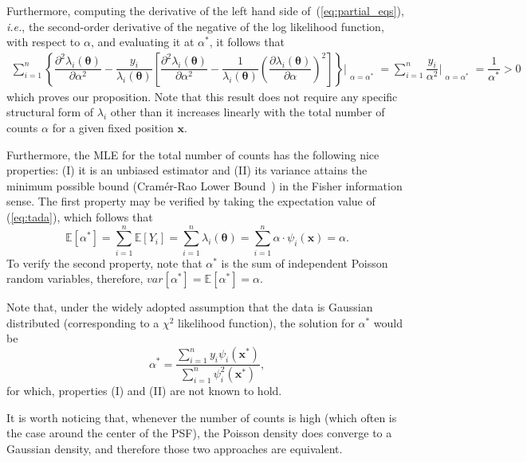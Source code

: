 \documentclass{rnaastex}
\begin{document}
Furthermore, computing the derivative of the left hand side
of~(\ref{eq:partial_eqs}), \textit{i.e.}, the second-order derivative of the
negative of the log likelihood function, with respect to $\alpha$, and
evaluating it at $\alpha^{*}$, it follows that
\begin{align}
    \sum_{i=1}^{n}\left\{\dfrac{\partial^2 \lambda_i\left(\bm{\theta}\right)}{\partial \alpha^2}
    - \dfrac{y_i}{\lambda_i\left(\bm{\theta}\right)}\left[\dfrac{\partial^2 \lambda_i
    \left(\bm{\theta}\right)}{\partial \alpha^2} - \dfrac{1}{\lambda_i\left(\bm{\theta}\right)}
    \left(\dfrac{\partial \lambda_i\left(\bm{\theta}\right)}{\partial \alpha}\right)^2\right]\right\}
    \Bigr|_{\substack{\alpha=\alpha^{*}}} = \sum_{i=1}^{n}\dfrac{y_i}{\alpha^2}
    \Bigr|_{\substack{\alpha=\alpha^{*}}} = \dfrac{1}{\alpha^{*}} > 0
    \label{eq:partial2_eqs}
\end{align}
which proves our proposition. Note that this result does not require any
specific structural form of $\lambda_i$ other than it increases linearly with
the total number of counts $\alpha$ for a given fixed position $\bm{x}$.

Furthermore, the MLE for the total number of counts has the following nice
properties: (\textrm{I}) it is an unbiased estimator and (\textrm{II}) its
variance attains the minimum possible bound (Cram\'er-Rao Lower
Bound~\citep{bobrovsky:1987}) in the Fisher information sense. The first
property may be verified by taking the expectation value of (\ref{eq:tada}),
which follows that
\begin{equation}
    \mathbb{E}\left[\alpha^{*}\right] = \sum_{i=1}^{n}\mathbb{E}[Y_i] =
    \sum_{i=1}^{n} \lambda_i(\bm{\theta}) =
    \sum_{i=1}^{n} \alpha\cdot\psi_i(\bm{x}) = \alpha.
\end{equation}
To verify the second property, note that $\alpha^{*}$ is the sum of independent
Poisson random variables, therefore, $var\left[\alpha^{*}\right] =
\mathbb{E}\left[\alpha^{*}\right] = \alpha$.

Note that, under the widely adopted assumption that the data is Gaussian
distributed (corresponding to a $\chi^2$ likelihood function),
the solution for $\alpha^{*}$ would be
\begin{equation}
    \alpha^{*} = \dfrac{\sum_{i=1}^{n}y_i \psi_i(\bm{x}^{*})}{\sum_{i=1}^{n}\psi^2_i(\bm{x}^{*})},
\end{equation}
for which, properties (I) and (II) are not known to hold.

It is worth noticing that, whenever the number of counts is high (which often
is the case around the center of the PSF), the Poisson density does converge to
a Gaussian density, and therefore those two approaches are equivalent.
\end{document}
